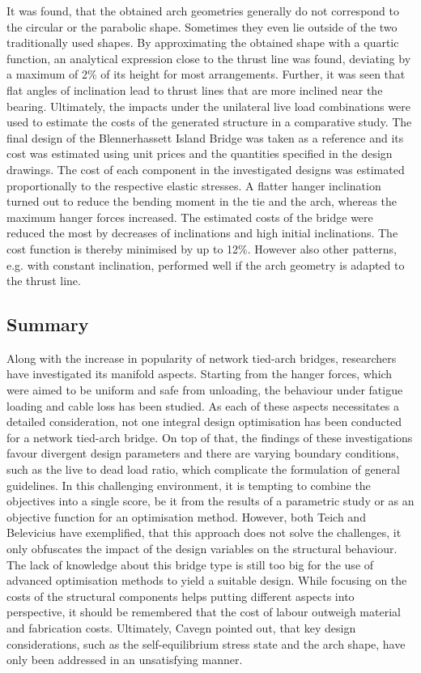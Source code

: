It was found, that the obtained arch geometries generally do not correspond to the circular or the parabolic shape. Sometimes they even lie outside of the two traditionally used shapes. By approximating the obtained shape with a quartic function, an analytical expression close to the thrust line was found, deviating by a maximum of 2\% of its height for most arrangements. Further, it was seen that flat angles of inclination lead to thrust lines that are more inclined near the bearing. Ultimately, the impacts under the unilateral live load combinations were used to estimate the costs of the generated structure in a comparative study. The final design of the Blennerhassett Island Bridge was taken as a reference and its cost was estimated using unit prices and the quantities specified in the design drawings. The cost of each component in the investigated designs was estimated proportionally to the respective elastic stresses. A flatter hanger inclination turned out to reduce the bending moment in the tie and the arch, whereas the maximum hanger forces increased. The estimated costs of the bridge were reduced the most by decreases of inclinations and high initial inclinations. The cost function is thereby minimised by up to 12\%. However also other patterns, e.g. with constant inclination, performed well if the arch geometry is adapted to the thrust line.


\subsection{Summary} \label{sec:rev_sum}
Along with the increase in popularity of network tied-arch bridges, researchers have investigated its manifold aspects. Starting from the hanger forces, which were aimed to be uniform and safe from unloading, the behaviour under fatigue loading and cable loss has been studied. As each of these aspects necessitates a detailed consideration, not one integral design optimisation has been conducted for a network tied-arch bridge. On top of that, the findings of these investigations favour divergent design parameters and there are varying boundary conditions, such as the live to dead load ratio, which complicate the formulation of general guidelines. In this challenging environment, it is tempting to combine the objectives into a single score, be it from the results of a parametric study or as an objective function for an optimisation method. However, both Teich and Belevicius have exemplified, that this approach does not solve the challenges, it only obfuscates the impact of the design variables on the structural behaviour. The lack of knowledge about this bridge type is still too big for the use of advanced optimisation methods to yield a suitable design. While focusing on the costs of the structural components helps putting different aspects into perspective, it should be remembered that the cost of labour outweigh material and fabrication costs. Ultimately, Cavegn pointed out, that key design considerations, such as the self-equilibrium stress state and the arch shape, have only been addressed in an unsatisfying manner. 


